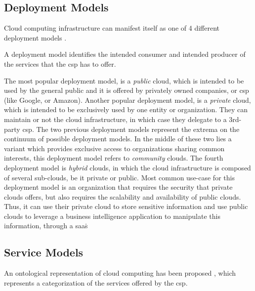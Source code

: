 \documentclass[12pt, titlepage]{uo_temp}
\begin{document}
     

     \subsection{Deployment Models}
     Cloud computing infrastructure can manifest itself as one of 4 different
     deployment models \cite{nist}.

     A deployment model identifies the intended consumer and intended producer of the
     services that the \gls{csp} has to offer. 

     The most popular deployment model, is a \emph{public} cloud, which is intended to be used by
     the general public and it is offered by privately owned companies, or \gls{csp} (like Google, or
     Amazon). 
     Another popular deployment model, is a \emph{private} cloud, which is intended to be
     exclusively used by one entity or organization. They can maintain or not the cloud 
     infrastructure, in which case they delegate to a 3rd-party \gls{csp}.
     The two previous deployment models represent the extrema on the continuum of possible
     deployment models. In the middle of these two lies a variant which provides exclusive
     access to organizations sharing common interests, this deployment model refers to
     \emph{community} clouds. 
     The fourth deployment model is \emph{hybrid} clouds, in which the cloud
     infrastructure is composed of several sub-clouds, be it private or public. Most
     common use-case for this deployment model is an organization that requires the
     security that private clouds offers, but also requires the scalability and
     availability of public clouds. Thus, it can use their private cloud to store
     sensitive information and use public clouds to leverage a business intelligence
     application to manipulate this information, through a \gls{saas}\.
     
     \subsection{Service Models}
     An ontological representation of cloud computing has been proposed \cite{ontology},
     which represents a categorization of the services offered by the \gls{csp}.
\end{document}
